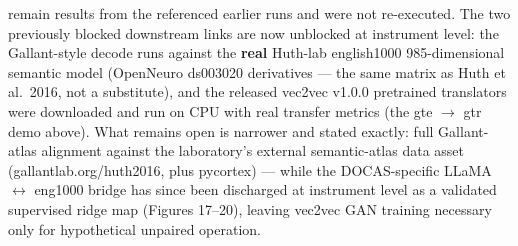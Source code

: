 \documentclass[
]{article}
\begin{document}
remain results from the referenced earlier runs and were not
re-executed. The two previously blocked downstream links are now
unblocked at instrument level: the Gallant-style decode runs against the
\textbf{real} Huth-lab english1000 985-dimensional semantic model
(OpenNeuro ds003020 derivatives --- the same matrix as Huth et al.~2016,
not a substitute), and the released vec2vec v1.0.0 pretrained
translators were downloaded and run on CPU with real transfer metrics
(the gte \(\to\) gtr demo above). What remains open is narrower and
stated exactly: full Gallant-atlas alignment against the laboratory's
external semantic-atlas data asset (gallantlab.org/huth2016, plus
pycortex) --- while the DOCAS-specific LLaMA \(\leftrightarrow\) eng1000
bridge has since been discharged at instrument level as a validated
supervised ridge map (Figures 17--20), leaving vec2vec GAN training
necessary only for hypothetical unpaired operation.
\end{document}
